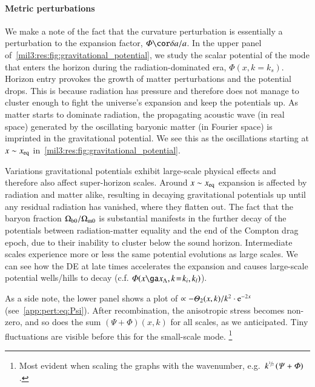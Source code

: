\paragraph{Metric perturbations}
We make a note of the fact that the curvature perturbation is essentially a perturbation to the expansion factor, $\Phi \cor \delta a /a$. In the upper panel of~\cref{mil3:res:fig:gravitational_potential}, we study the scalar potential of the mode that enters the horizon during the radiation-dominated era, $\Phi(x,k\!=\!k_s)$. Horizon entry provokes the growth of matter perturbations and the potential drops. This is because radiation has pressure and therefore does not manage to cluster enough to fight the universe's expansion and keep the potentials up. As matter starts to dominate radiation, the propagating acoustic wave (in real space) generated by the oscillating baryonic matter (in Fourier space) is imprinted in the gravitational potential. We see this as the oscillations starting at $x \sim x_\mathrm{eq}$ in~\cref{mil3:res:fig:gravitational_potential}.

Variations gravitational potentials exhibit large-scale physical effects and therefore also affect super-horizon scales. Around $x \sim x_\mathrm{eq}$ expansion is affected by radiation and matter alike, resulting in decaying gravitational potentials up until any residual radiation has vanished, where they flatten out. The fact that the baryon fraction $\Omega_\mathrm{b0}/\Omega_{\mathrm{m}0}$ is substantial manifests in the further decay of the potentials between radiation-matter equality and the end of the Compton drag epoch, due to their inability to cluster below the sound horizon. Intermediate scales experience more or less the same potential evolutions as large scales. We can see how the DE at late times accelerates the expansion and causes large-scale potential wells/hills to decay (c.f. $\Phi(x\ga x_\Lambda, k\!=\!k_i, k_l)$). %


As a side note, the lower panel shows a plot of $\propto -\Theta_2(x, k)/k^2\cdot \eu[-2x]$ (see~\cref{app:pert:eq:Psi}). After recombination, the anisotropic stress becomes non-zero, and so does the sum $\left(\Psi + \Phi\right)(x,k)$ for all scales, as we anticipated. Tiny fluctuations are visible before this for the small-scale mode.
\footnote{Most evident when scaling the graphs with the wavenumber, e.g.~$k^{\sfrac{3}{2}} \left(\varPsi + \varPhi \right)$.}


